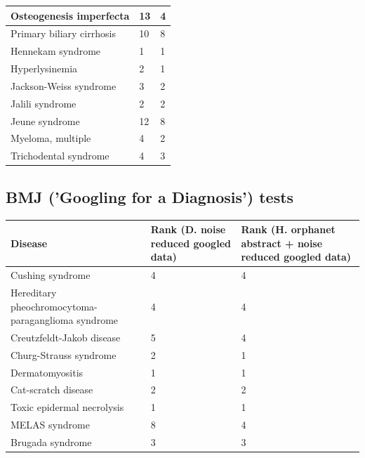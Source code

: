 \documentclass[10pt,letterpaper,two column,final]{article}
\begin{document}
\begin{center}
\begin{small}
\begin{longtable}{|p{6cm}|p{2.5cm}|p{2.5cm}|}
Osteogenesis imperfecta                 &  13 & 4 \\ \hline
Primary biliary cirrhosis               &  10 & 8 \\ \hline
Hennekam syndrome                       & 1  & 1 \\ \hline
Hyperlysinemia                          & 2  & 1 \\ \hline
Jackson-Weiss syndrome                  &  3 & 2 \\ \hline
Jalili syndrome                         &  2 & 2 \\ \hline
Jeune syndrome                          &  12 & 8 \\ \hline
Myeloma, multiple                       &  4 & 2 \\ \hline
Trichodental syndrome                   &  4 & 3 \\ \hline
	\end{longtable}
\end{small}
\end{center}

\subsection{BMJ ('Googling for a Diagnosis') tests }
\label{app:bmj_with_without}
\begin{center}
\begin{small}
	\begin{tabular}{|p{6cm}|p{2.5cm}|p{2.5cm}|}
	\hline
	\textbf{Disease}  & \textbf{Rank (D. noise reduced googled data)} & \textbf{Rank (H. orphanet abstract + noise reduced googled data)} \\
	\hline\hline
Cushing syndrome                        &  4 & 4 \\ \hline
Hereditary pheochromocytoma-paraganglioma syndrome  &  4 & 4 \\ \hline
Creutzfeldt-Jakob disease               & 5  & 4 \\ \hline
Churg-Strauss syndrome                  &  2 & 1 \\ \hline
Dermatomyositis                         &  1 & 1 \\ \hline
Cat-scratch disease                     &  2 & 2 \\ \hline
Toxic epidermal necrolysis              &  1 & 1 \\ \hline
MELAS syndrome                          &  8 & 4 \\ \hline
Brugada syndrome                        &  3 & 3 \\ \hline
	\end{tabular}
\end{small}
\end{center}
\end{document}
